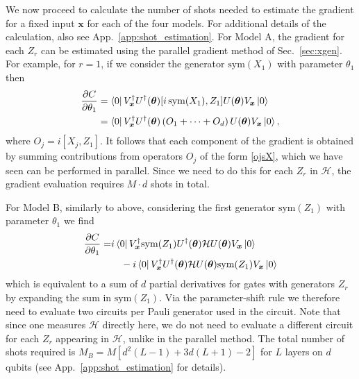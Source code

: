 \documentclass[a4paper,twocolumn,11pt]{quantumarticle}
\renewcommand{\vec}{\boldsymbol}
\begin{document}



We now proceed to calculate the number of shots needed to estimate the gradient for a fixed input $\vec{x}$ for each of the four models. For additional details of the calculation, also see App.\ \ref{app:shot_estimation}. For Model A, the gradient for each $Z_r$ can be estimated using the parallel gradient method of Sec.~\ref{sec:xgen}. For example, for $r=1$, if we consider the generator $\text{sym}(X_1)$ with parameter $\theta_1$ then 
\begin{align}
    \frac{\partial C}{\partial \theta_1} &= \bra{0}V_{\vec{x}}^\dagger U^\dagger(\vec{\theta})[i\,\text{sym}(X_1),Z_1] U(\vec{\theta})V_{\vec{x}}\ket{0}\nonumber\\
    &=\bra{0}V_{\vec{x}}^\dagger U^\dagger(\vec{\theta})\left(O_1+\cdots + O_d\right) U(\vec{\theta})V_{\vec{x}}\ket{0},
\end{align}
%
where $O_j=i[X_j,Z_1]$. It follows that each component of the gradient is obtained by summing contributions from operators $O_j$ of the form \eqref{ojsX}, which we have seen can be performed in parallel. Since we need to do this for each $Z_r$ in $\mathcal{H}$, the gradient evaluation requires $M\cdot d$ shots in total. 

For Model B, similarly to above, considering the first generator $\text{sym}(Z_1)$ with parameter $\theta_1$ we find
%
\begin{align}
    \frac{\partial C}{\partial \theta_1} =& i\bra{0}V_{\vec{x}}^\dagger \text{sym}(Z_1)U^\dagger(\vec{\theta})\mathcal{H}U(\vec{\theta})V_{\vec{x}}\ket{0} \nonumber\\ &\quad- i\bra{0}V_{\vec{x}}^\dagger U^\dagger(\vec{\theta})\mathcal{H}U(\vec{\theta})\text{sym}(Z_1)V_{\vec{x}}\ket{0} 
\end{align}
%
which is equivalent to a sum of $d$ partial derivatives for gates with generators $Z_r$ by expanding the sum in $\text{sym}(Z_1)$. Via the parameter-shift rule we therefore need to evaluate two circuits per Pauli generator used in the circuit.
Note that since one measures $\mathcal{H}$ directly here, we do not need to evaluate a different circuit for each $Z_r$ appearing in $\mathcal{H}$, unlike in the parallel method. The total number of shots required is $M_B=M\left[d^2(L-1)+3d(L+1)-2\right]$ for $L$ layers on $d$ qubits (see App.\ \ref{app:shot_estimation} for details).
\end{document}
